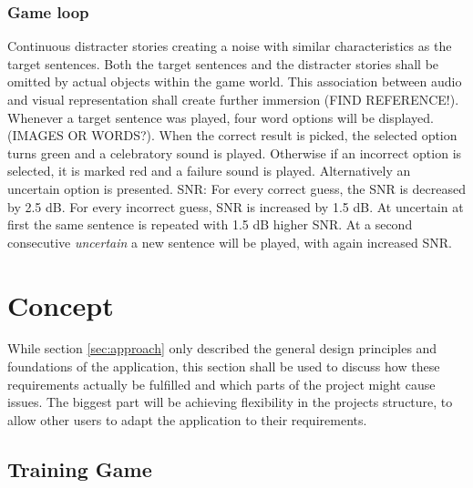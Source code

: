 \documentclass[a4paper,11pt]{article}%
\renewcommand{\\}{\vspace*{0.5\baselineskip} \newline}
\begin{document}
\subsubsection{Game loop}
Continuous distracter stories creating a noise with similar characteristics as the target sentences.
\newline
\newline
Both the target sentences and the distracter stories shall be omitted by actual objects within the game world. This association between audio and visual representation shall create further immersion (FIND REFERENCE!).
\newline
\newline
Whenever a target sentence was played, four word options will be displayed. (IMAGES OR WORDS?). When the correct result is picked, the selected option turns green and a celebratory sound is played. Otherwise if an incorrect option is selected, it is marked red and a failure sound is played. Alternatively an  \dq uncertain\dq{} option is presented.
\newline
\newline
SNR: For every correct guess, the SNR is decreased by 2.5 dB. For every incorrect guess, SNR is increased by 1.5 dB. At uncertain at first the same sentence is repeated with 1.5 dB higher SNR. At a second consecutive \textit{uncertain} a new sentence will be played, with again increased SNR.


\section{Concept}
\label{sec:concept}
While section \ref{sec:approach} only described the general design principles and foundations of the application, this section shall be used to discuss how these requirements  actually be fulfilled and which parts of the project might cause issues.
\newline
\newline
The biggest part will be achieving flexibility in the projects structure, to allow other users to adapt the application to their requirements.


\subsection{Training Game}
\end{document}
